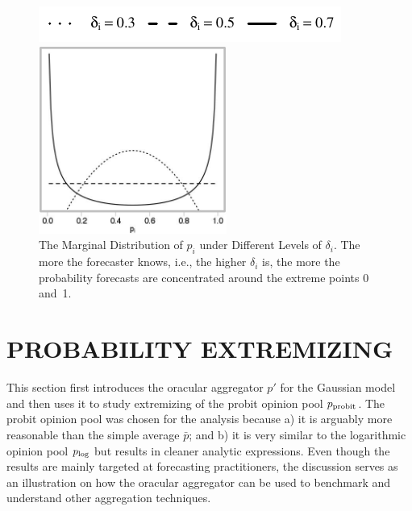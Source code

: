 \documentclass[12pt]{article}
\theoremstyle{definition}
\theoremstyle{definition}
\def\probit{p_{\rm probit}}
\def\plog{p_{\rm log}}
\begin{document}
\begin{figure}[t]
\centering
	\hspace{0em}\includegraphics{LegendMarginal}

 \includegraphics[width= 0.55\textwidth]{Marginals}
   \caption{The Marginal Distribution of $p_i$ under Different Levels of 
$\delta_i$.  The more the forecaster knows, i.e., the higher $\delta_i$ is, 
the more the probability forecasts are concentrated around the extreme 
points 0 and~1.}
\label{marginals}
\end{figure}

\section{PROBABILITY EXTREMIZING}
\label{extremizing}
This section first introduces the oracular aggregator $p'$ for the
Gaussian model and then uses it to study
extremizing of the probit opinion pool $\probit$. The probit opinion 
pool  was chosen for the analysis because a) it is arguably more
reasonable than the simple average $\bar{p}$; and b) it is very
similar to the logarithmic opinion pool $\plog$ but results in cleaner
analytic expressions. Even though the results are mainly targeted at forecasting practitioners, the discussion serves as an illustration on how the oracular aggregator can be used to benchmark and understand other aggregation techniques. 
\end{document}
